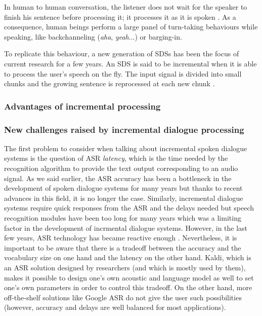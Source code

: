     	    In human to human conversation, the listener does not wait for the speaker to finish his sentence before processing it; it processes it as it is spoken \cite{Tanenhaus1995}. As a consequence, human beings perform a large panel of turn-taking behaviours while speaking, like backchanneling (\textit{aha}, \textit{yeah}...) or barging-in.
            
            To replicate this behaviour, a new generation of SDSs has been the focus of current research for a few years. An SDS is said to be incremental when it is able to process the user's speech on the fly. The input signal is divided into small chunks and the growing sentence is reprocessed at each new chunk \cite{Schlangen2011}.

            \subsubsection{Advantages of incremental processing}

            \subsubsection{New challenges raised by incremental dialogue processing}
    
                The first problem to consider when talking about incremental spoken dialogue systems is the question of ASR \textit{latency}, which is the time needed by the recognition algorithm to provide the text output corresponding to an audio signal. As we said earlier, the ASR accuracy has been a bottleneck in the development of spoken dialogue systems for many years but thanks to recent advances in this field, it is no longer the case. Similarly, incremental dialogue systems require quick responses from the ASR and the delays needed but speech recognition modules have been too long for many years which was a limiting factor in the development of incrmental dialogue systems. However, in the last few years, ASR technology has became reactive enough \cite{Platek2014}. Nevertheless, it is important to be aware that there is a tradeoff between the accuracy and the vocabulary size on one hand and the latency on the other hand. Kaldi, which is an ASR solution designed by researchers (and which is mostly used by them), makes it possible to design one's own acoustic and language model as well to set one's own parameters in order to control this tradeoff. On the other hand, more off-the-shelf solutions like Google ASR do not give the user such possibilities (however, accuracy and delays are well balanced for most applications).

